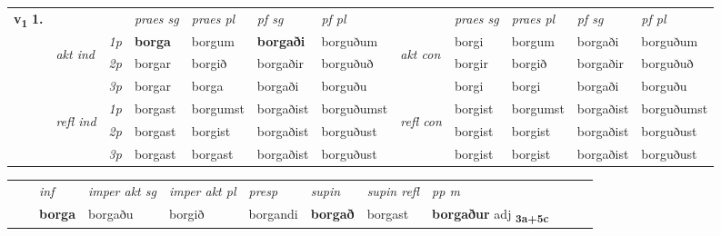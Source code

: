 

\begin{tabular}{llllllllllll} \toprule
\multirow{4}{*}{{{\textbf{v{\textsubscript{1}}} \Large{\textbf{1.}}}}}  & &   &  \textit{praes sg}  & \textit{praes pl}  &\textit{ pf sg} & \textit{pf pl} &  &  \textit{praes sg}  & \textit{praes pl}  & \textit{pf sg} & \textit{pf pl } \\*
	\cmidrule{4-7} \cmidrule{9-12}
 & \multirow{3}{*}{\begin{turn}{90}\textit{akt ind}\end{turn}} & {\textit{1p}} & \textbf{borga} & borgum    & \textbf{borgaði} & borguðum & \multirow{3}{*}{\begin{turn}{90}\textit{akt con}\end{turn}} &borgi & borgum & borgaði & borguðum\\*
& &  {\textit{2p}} &  borgar  & borgið   & borgaðir & borguðuð & & borgir & borgið & borgaðir & borguðuð \\*
& &  {\textit{3p}} & borgar & borga   & borgaði & borguðu & & borgi & borgi& borgaði & borguðu  \\*
\cmidrule{4-7} \cmidrule{9-12}
 &\multirow{3}{*}{\begin{turn}{90}\textit{refl ind}\end{turn}} & {\textit{1p}} & borgast & borgumst    & borgaðist & borguðumst & \multirow{3}{*}{\begin{turn}{90}\textit{refl con}\end{turn}}  &borgist & borgumst & borgaðist & borguðumst\\*
 &&  {\textit{2p}} &  borgast  & borgist   & borgaðist & borguðust & &borgist & borgist & borgaðist & borguðust \\*
& &  {\textit{3p}} & borgast & borgast   & borgaðist & borguðust & & borgist & borgist& borgaðist & borguðust  \\*
\cmidrule{4-7} \cmidrule{9-12}
\end{tabular}


\begin{tabular}{llllllllllll}
 & & \textit{inf} & \textit{imper akt sg} & \textit{imper akt pl}   & \textit{presp} & \textit{supin} & \textit{supin refl} & \textit{pp m}     \\*
  & & \textbf{borga} & borgaðu  & borgið   & borgandi &  \textbf{borgað} & borgast & \textbf{borgaður} adj \textbf{\textsubscript{3a+5c}} \\*
\cmidrule{1-12}
\end{tabular}



